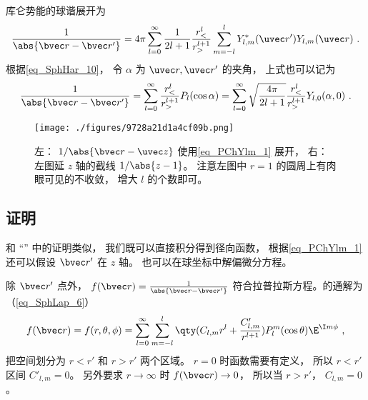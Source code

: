 
\begin{issues}
\issueDraft
\end{issues}


库仑势能的球谐展开为
\begin{equation}
\frac{1}{\abs{\bvec r - \bvec r'}} = 4\pi \sum_{l=0}^{\infty} \frac{1}{2l+1} \frac{r_<^l}{r_>^{l+1}} \sum_{m = -l}^l Y_{l,m}^*(\uvec r') Y_{l,m}(\uvec r)~.
\end{equation}
根据\autoref{eq_SphHar_10}， 令 $\alpha$ 为 $\uvec r, \uvec r'$ 的夹角， 上式也可以记为
\begin{equation}\label{eq_PChYlm_1}
\frac{1}{\abs{\bvec r - \bvec r'}} = \sum_{l=0}^{\infty} \frac{r_<^l}{r_>^{l+1}} P_l(\cos\alpha) = \sum_{l=0}^{\infty} \sqrt{\frac{4\pi}{2l+1}} \frac{r_<^l}{r_>^{l+1}} Y_{l,0}(\alpha, 0)~.
\end{equation}

\begin{figure}[ht]
\centering
\texttt{[image: ./figures/9728a21d1a4cf09b.png]}
\caption{左： $1/\abs{\bvec r - \uvec z}$ 使用\autoref{eq_PChYlm_1} 展开， 右： 左图延 $z$ 轴的截线 $1/\abs{z - 1}$。 注意左图中 $r = 1$ 的圆周上有肉眼可见的不收敛， 增大 $l$ 的个数即可。} \label{fig_PChYlm_1}
\end{figure}

\subsection{证明}
和 “” 中的证明类似， 我们既可以直接积分得到径向函数， 根据\autoref{eq_PChYlm_1} 还可以假设 $\bvec r'$ 在 $z$ 轴。 也可以在球坐标中解偏微分方程。

除 $\bvec r'$ 点外， $f(\bvec r) = \frac{1}{\abs{\bvec r - \bvec r'}}$ 符合拉普拉斯方程。的通解为（\autoref{eq_SphLap_6}）
\begin{equation}
f(\bvec r) = f(r, \theta, \phi) = \sum_{l = 0}^\infty \sum_{m = -l}^l \qty(C_{l,m} r^l + \frac{C'_{l,m}}{r^{l+1}})P_l^m(\cos\theta)\E^{\I m\phi}~,
\end{equation}
把空间划分为 $r < r'$ 和 $r > r'$ 两个区域。 $r = 0$ 时函数需要有定义， 所以 $r < r'$ 区间 $C'_{l,m} = 0$。 另外要求 $r \to \infty$ 时 $f(\bvec r) \to 0$， 所以当 $r > r'$， $C_{l,m} = 0$。


